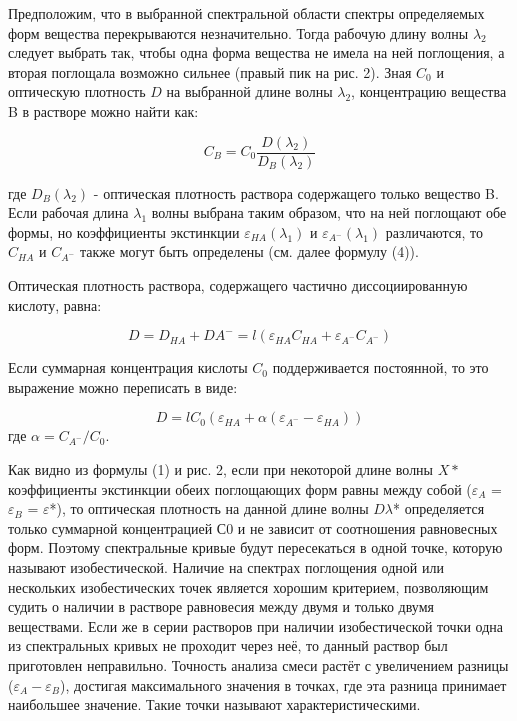 \documentclass[a4paper,12pt]{article}
\begin{document}
Предположим, что в выбранной спектральной области спектры
определяемых форм вещества перекрываются незначительно. Тогда рабочую длину волны $\lambda_2$ следует выбрать так, чтобы одна форма вещества не имела на ней поглощения, а вторая поглощала возможно сильнее (правый пик на рис. 2). Зная $C_0$ и оптическую плотность $D$ на выбранной длине волны $\lambda_2$, концентрацию вещества B в растворе можно найти как:

\begin{equation}
    C_B=C_0\frac{D(\lambda_2)}{D_B(\lambda_2)}
    \nonumber
\end{equation}

где $D_B(\lambda_2)$ - оптическая плотность раствора содержащего только вещество B. Если рабочая длина $\lambda_1$ волны выбрана таким образом, что на ней поглощают обе формы, но коэффициенты экстинкции 
$\varepsilon_{HA}(\lambda_1)$ и $\varepsilon_{A^-}(\lambda_1)$ различаются, то $C_{HA}$ и $C_{A^-}$ также могут быть определены (см. далее формулу (4)).

Оптическая плотность раствора, содержащего частично диссоциированную кислоту, равна:

\begin{equation}
    D = D_{HA} + D{A^{-}} = l(\varepsilon_{HA}C_{HA} + \varepsilon_{A^-}C_{A^-})
    \nonumber
\end{equation}

Если суммарная концентрация кислоты $C_0$ поддерживается постоянной, то это выражение можно переписать в виде:

\begin{equation}
    D = lC_0(\varepsilon_{HA} + \alpha(\varepsilon_{A^-} - \varepsilon_{HA}))
\end{equation}
где $\alpha = C_{A^-}/C_0$.

Как видно из формулы (1) и рис. 2, если при некоторой длине волны $X*$ коэффициенты экстинкции обеих поглощающих форм равны между собой ($\varepsilon_A$ = $\varepsilon_B$ = $\varepsilon$*), то оптическая плотность на данной длине волны $D\lambda$* определяется только суммарной концентрацией С0 и не зависит от соотношения равновесных форм. Поэтому спектральные кривые будут пересекаться в одной точке, которую называют изобестической.
Наличие на спектрах поглощения одной или нескольких изобестических точек является хорошим критерием, позволяющим судить о наличии в растворе равновесия между двумя и только двумя веществами. Если же в серии растворов при наличии изобестической точки одна из спектральных кривых не проходит через неё, то данный раствор был приготовлен неправильно.
Точность анализа смеси растёт с увеличением разницы ($\varepsilon_A - \varepsilon_B$), достигая максимального значения в точках, где эта разница принимает наибольшее значение. Такие точки называют характеристическими.
\end{document}
